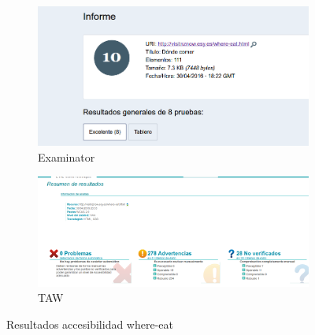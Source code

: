 	\begin{figure}
		\centering
		\begin{subfigure}{.5\textwidth}
			\centering
			\includegraphics[width=.8\linewidth]{./Fotos/exa-eat.png}
			\caption{Examinator}
			\label{fig: Examinator where-eat}
		\end{subfigure}%
		\begin{subfigure}{.5\textwidth}
			\centering
			\includegraphics[width=.8\linewidth]{./Fotos/taw-eat.png}
			\caption{TAW}
			\label{fig: TAW where-eat}
		\end{subfigure}
		\caption{Resultados accesibilidad where-eat}
		\label{fig:Resultados accesibilidad where-eat}
	\end{figure}
